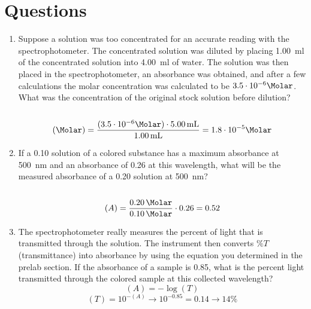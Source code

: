 \documentclass[a4paper]{article}
\begin{document}
    \section{Questions}
        \begin{enumerate}
            \item Suppose a solution was too concentrated for an accurate reading
            with the spectrophotometer. The concentrated solution was diluted
            by placing \SI{1.00}{\ml} of the concentrated solution into
            \SI{4.00}{\ml} of water. The solution was then placed in the
            spectrophotometer, an absorbance was obtained, and after a few
            calculations the molar concentration was calculated to be
            \(3.5\cdot10^{-6}\si\Molar\). What was the concentration of the
            original stock solution before dilution? \\\\
            \[(\si\Molar) = \frac{(3.5\cdot10^{-6}\si\Molar)\cdot\SI{5.00}{\ml}}{\SI{1.00}{\ml}} = 1.8\cdot10^{-5}\si\Molar\]
            \item If a \SI{0.10}{\Molar} solution of a colored substance has a
            maximum absorbance at \SI{500}{\nm} and an absorbance of 0.26
            at this wavelength, what will be the measured absorbance of a
            \SI{0.20}{\Molar} solution at \SI{500}{\nm}? \\\\
            \[(A) = \frac{\SI{0.20}{\Molar}}{\SI{0.10}{\Molar}}\cdot0.26 = 0.52\]
            \item The spectrophotometer really measures the percent of light
            that is transmitted through the solution. The instrument then converts
            \(\%T\) (transmittance) into absorbance by using the equation you
            determined in the prelab section. If the absorbance of a sample is
            0.85, what is the percent light transmitted through the colored
            sample at this collected wavelength?
            \[(A) = -\log{(T)}\]
            \[(T) = 10^{-(A)}\to10^{-0.85} = 0.14\to14\%\]
        \end{enumerate}
\end{document}

